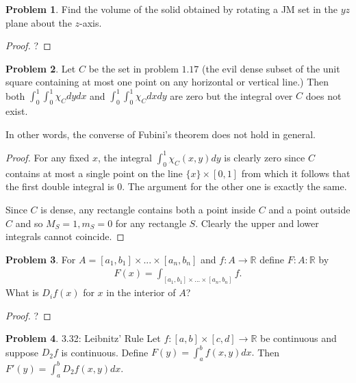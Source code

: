 \documentclass[20pt]{article}
\theoremstyle{plain}
\theoremstyle{definition}
\newtheorem*{problem}{Problem}
\newcommand{\reals}{\mathbb{R}}
\begin{document}
\begin{problem}{3.29}
  Find the volume of the solid obtained by rotating a 
  JM set in the $yz$ plane about the $z$-axis.
\end{problem}
\begin{proof}
  \color{ForestGreen}?
\end{proof}





\begin{problem}{3.30}
  Let $C$ be the set in problem $1.17$ (the evil dense subset of the unit square 
  containing at most one point on any horizontal or vertical line.)
  Then both $\int_0^1 \int_0^1 \chi_C dydx$ and  $\int_0^1 \int_0^1 \chi_C dxdy$
  are zero but the integral over $C$ does not exist.

  In other words, the converse of Fubini's theorem does not hold in general.
\end{problem}

\begin{proof}
  For any fixed $x$, the integral $\int_0^1\chi_C(x, y)dy$ is clearly zero since
  $C$ contains at most a single point on the line $\{x\} \times [0,1]$ from which
  it follows that the first double integral is $0$.  The argument for the other one
  is exactly the same.

  Since $C$ is dense, any rectangle contains both a point inside $C$ and
  a point outside $C$ and so $M_S = 1, m_S = 0$ for any rectangle $S$.
  Clearly the upper and lower integrals cannot coincide.
\end{proof}


\begin{problem}{3.31}
  For $A = [a_1, b_1] \times ...\times [a_n, b_n]$ and $f: A \to \reals$
  define $F: A: \reals$ by
  \begin{align*}
    F(x) = \int_{[a_1, b_1]\times ... \times[a_n, b_n]}f.
  \end{align*}
  What is $D_if(x)$ for $x$ in the interior of $A$?
\end{problem}

\begin{proof}
  \color{ForestGreen}?
\end{proof}



\begin{problem}{3.32: Leibnitz' Rule}
  Let $f: [a, b] \times [c, d] \to \reals$ be continuous and suppose
  $D_2f$ is continuous.  Define $F(y) = \int_a^bf(x, y)dx.$
  Then $F'(y) = \int_a^bD_2f(x, y)dx.$
\end{problem}
\end{document}
